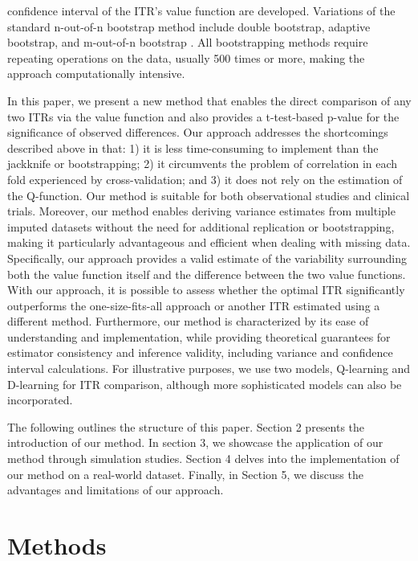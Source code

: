\documentclass{article}
\begin{document}
confidence interval of the ITR's value function are developed. Variations of the standard n-out-of-n bootstrap method include double bootstrap\cite{chakraborty2010inference}, adaptive bootstrap\cite{laber2011adaptive}, and m-out-of-n bootstrap \cite{chakraborty2013inference}. All bootstrapping methods require repeating operations on the data, usually 500 times or more, making the approach computationally intensive.

In this paper, we present a new method that enables the direct comparison of any two ITRs via the value function and also provides a t-test-based p-value for the significance of observed differences. Our approach addresses the shortcomings described above in that: 1) it is less time-consuming to implement than the jackknife or bootstrapping;  2) it circumvents the problem of correlation in each fold experienced by cross-validation; and 3) it does not rely on the estimation of the Q-function. Our method is suitable for both observational studies and clinical trials. Moreover, our method enables deriving variance estimates from multiple imputed datasets without the need for additional replication or bootstrapping, making it particularly advantageous and efficient when dealing with missing data. Specifically, our approach provides a valid estimate of the variability surrounding both the value function itself and the difference between the two value functions. With our approach, it is possible to assess whether the optimal ITR significantly outperforms the one-size-fits-all approach or another ITR estimated using a different method. Furthermore, our method is characterized by its ease of understanding and implementation, while providing theoretical guarantees for estimator consistency and inference validity, including variance and confidence interval calculations. For illustrative purposes, we use two models, Q-learning \citep{qian2011performance} and D-learning \citep{tian2014simple} for ITR comparison, although more sophisticated models can also be incorporated.


The following outlines the structure of this paper. Section 2 presents the introduction of our method. In section 3, we showcase the application of our method through simulation studies. Section 4 delves into the implementation of our method on a real-world dataset. Finally, in Section 5, we discuss the advantages and limitations of our approach.


\section{Methods}\label{sec2}
\end{document}
